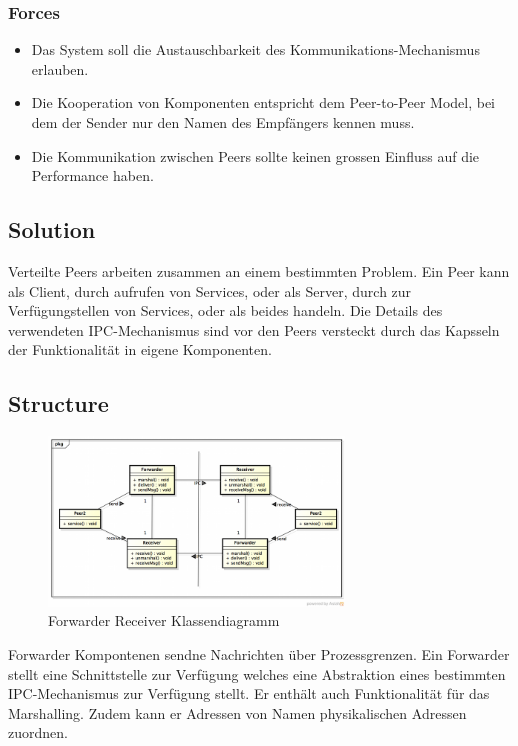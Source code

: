 \subsubsection*{Forces}


\begin{itemize}
	\item Das System soll die Austauschbarkeit des Kommunikations-Mechanismus erlauben.
	\item Die Kooperation von Komponenten entspricht dem Peer-to-Peer Model, bei dem der Sender nur den Namen des Empfängers kennen muss.
	\item Die Kommunikation zwischen Peers sollte keinen grossen Einfluss auf die Performance haben.
\end{itemize}

\subsection*{Solution}


Verteilte Peers arbeiten zusammen an einem bestimmten Problem. Ein Peer kann als Client, durch aufrufen von Services, oder als Server, durch zur Verfügungstellen von Services, oder als beides handeln. Die Details des verwendeten IPC-Mechanismus sind vor den Peers versteckt durch das Kapsseln der Funktionalität in eigene Komponenten.

\subsection*{Structure}

\begin{figure}[H]
	\centering
	\includegraphics[width=0.7\textwidth]{content/posa1/images/forwarder-receiver-classes.png}
	\caption{Forwarder Receiver Klassendiagramm}
\end{figure}


Forwarder Kompontenen sendne Nachrichten über Prozessgrenzen. Ein Forwarder stellt eine Schnittstelle zur Verfügung welches eine Abstraktion eines bestimmten IPC-Mechanismus zur Verfügung stellt. Er enthält auch Funktionalität für das Marshalling. Zudem kann er Adressen von Namen physikalischen Adressen zuordnen.

